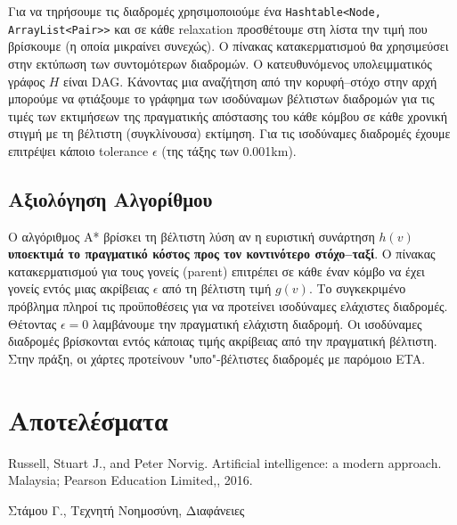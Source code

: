 \documentclass[a4paper,12pt]{article}
\begin{document}
Για να τηρήσουμε τις διαδρομές χρησιμοποιούμε ένα \texttt{Hashtable<Node, ArrayList<Pair>>} και σε κάθε relaxation προσθέτουμε στη λίστα την τιμή που βρίσκουμε (η οποία μικραίνει συνεχώς). Ο πίνακας κατακερματισμού θα χρησιμεύσει στην εκτύπωση των συντομότερων διαδρομών. Ο κατευθυνόμενος υπολειμματικός γράφος $H$ είναι DAG. Κάνοντας μια αναζήτηση από την κορυφή--στόχο στην αρχή μπορούμε να φτιάξουμε το γράφημα των ισοδύναμων βέλτιστων διαδρομών για τις τιμές των εκτιμήσεων της πραγματικής απόστασης του κάθε κόμβου σε κάθε χρονική στιγμή με τη βέλτιστη (συγκλίνουσα) εκτίμηση. Για τις ισοδύναμες διαδρομές έχουμε επιτρέψει κάποιο tolerance $\epsilon$ (της τάξης των 0.001km).  

\subsection{Αξιολόγηση Αλγορίθμου} 

Ο αλγόριθμος Α* βρίσκει τη βέλτιστη λύση αν η ευριστική συνάρτηση $h(v)$ \textbf{υποεκτιμά το πραγματικό κόστος προς τον κοντινότερο στόχο--ταξί}. Ο πίνακας κατακερματισμού για τους γονείς (parent) επιτρέπει σε κάθε έναν κόμβο να έχει γονείς εντός μιας ακρίβειας $\epsilon$ από τη βέλτιστη τιμή $g(v)$. Το συγκεκριμένο πρόβλημα πληροί τις προϋποθέσεις για να προτείνει ισοδύναμες ελάχιστες διαδρομές. Θέτοντας $\epsilon = 0$ λαμβάνουμε την πραγματική ελάχιστη διαδρομή. Οι ισοδύναμες διαδρομές βρίσκονται εντός κάποιας τιμής ακρίβειας από την πραγματική βέλτιστη. Στην πράξη, οι χάρτες προτείνουν "υπο"-βέλτιστες διαδρομές με παρόμοιο ETA. 

\newpage
\section{Αποτελέσματα}




\begin{thebibliography}{9}

 Russell, Stuart J., and Peter Norvig. Artificial intelligence: a modern approach. Malaysia; Pearson Education Limited,, 2016.

 Στάμου Γ., Τεχνητή Νοημοσύνη, Διαφάνειες

\end{thebibliography}
\end{document}

